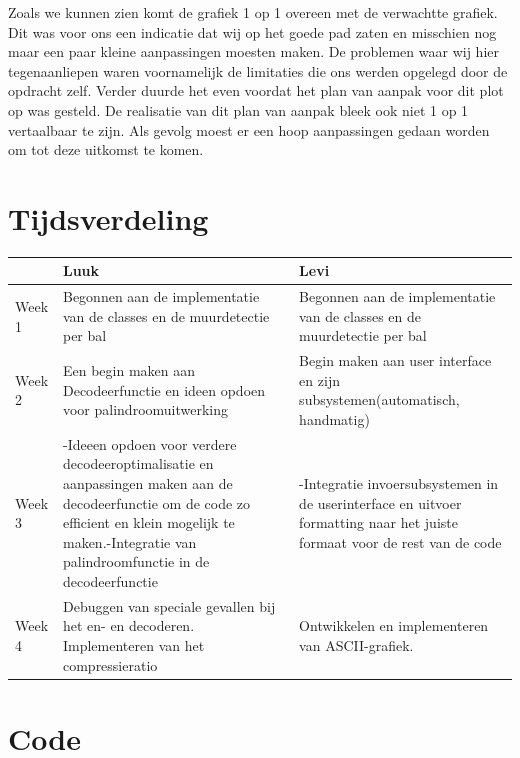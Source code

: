 \documentclass{article}
\begin{document}
Zoals we kunnen zien komt de grafiek 1 op 1 overeen met de verwachtte grafiek. Dit was voor ons een indicatie dat wij op het goede pad zaten en misschien nog maar een paar kleine aanpassingen moesten maken. De problemen waar wij hier tegenaanliepen waren voornamelijk de limitaties die ons werden opgelegd door de opdracht zelf. Verder duurde het even voordat het plan van aanpak voor dit plot op was gesteld. De realisatie van dit plan van aanpak bleek ook niet 1 op 1 vertaalbaar te zijn. Als gevolg moest er een hoop aanpassingen gedaan worden om tot deze uitkomst te komen.  

\section{Tijdsverdeling}

\begin{tabular}{ l | p{6cm} p{6cm} }
   & Luuk & Levi \\
  \hline
  Week 1 & Begonnen aan de implementatie van de classes en de muurdetectie per bal &  Begonnen aan de implementatie van de classes en de muurdetectie per bal \\
  Week 2 & Een begin maken aan Decodeerfunctie en ideen opdoen voor palindroomuitwerking & Begin maken aan user interface en zijn subsystemen(automatisch, handmatig) \\
  Week 3 & -Ideeen opdoen voor verdere decodeeroptimalisatie en aanpassingen maken aan de decodeerfunctie om de code zo efficient en klein mogelijk te maken.\linebreak -Integratie van palindroomfunctie in de decodeerfunctie & -Integratie invoersubsystemen in de userinterface en uitvoer formatting naar het juiste formaat voor de rest van de code  \\
  Week 4  & Debuggen van speciale gevallen bij het en- en decoderen. Implementeren van het compressieratio & Ontwikkelen en implementeren van ASCII-grafiek.   \\
 
 
 
  
\end{tabular}

\section{Code}

 \begin{lstlisting}[frame=single, language=python]
 
 
 
 \end{lstlisting}
\end{document}
